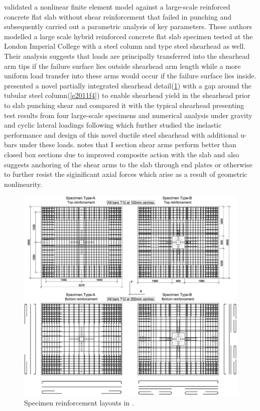 \cite{eder2010} validated a nonlinear finite element model against a large-scale reinforced concrete flat slab without shear reinforcement that failed in punching and subsequently carried out a parametric analysis of key parameters. These authors modelled a large scale hybrid reinforced concrete flat slab specimen tested at the London Imperial College with a steel column and \cite{aci31808} type steel shearhead as well. Their analysis suggests that loads are principally transferred into the shearhead arm tips if the failure surface lies outside shearhead arm length while a more uniform load transfer into these arms would occur if the failure surface lies inside. \cite{EDER20111164} presented a novel partially integrated shearhead detail(\ref{e2011f3}) with a gap around the tubular steel column(\ref{e2011f4}) to enable shearhead yield in the shearhead prior to slab punching shear and compared it with the typical \cite{aci31808} shearhead presenting test results from four large-scale specimens and numerical analysis under gravity and cyclic lateral loadings following which \cite{EDER2012239} further studied the inelastic performance and design of this novel ductile steel shearhead with additional u-bars under these loads. \cite{EDER2012239} notes that I section shear arms perform better than closed box sections due to improved composite action with the slab and also suggests anchoring of the shear arms to the slab through end plates or otherwise to further resist the siginificant axial forces which arise as a result of geometric nonlinearity. 
    \begin{figure}\centering
    \includegraphics[width=\columnwidth]{Figures/e2011f3.pdf}
    \caption{Specimen reinforcement layouts in \cite{EDER20111164}.}
    \label{e2011f3}
    \end{figure}
